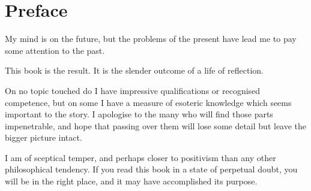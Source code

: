 \chapter*{Preface}


My mind is on the future, but the problems of the present have lead me to pay some attention to the past.

This book is the result.
It is the slender outcome of a life of reflection.

On no topic touched do I have impressive qualifications or recognised competence,
but on some I have a measure of esoteric knowledge which seems important to the story.
I apologise to the many who will find those parts impenetrable, and hope that passing over them will lose some detail but leave the bigger picture intact.

I am of sceptical temper, and perhaps closer to positivism than any other philosophical tendency.
If you read this book in a state of perpetual doubt, you will be in the right place, and it may have accomplished its purpose.

